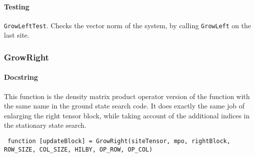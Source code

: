  \paragraph{Testing} \lstinline$GrowLeftTest$. Checks the vector norm of the system, by calling \lstinline$GrowLeft$ on the last site.
 
 \subsubsection{GrowRight}
 \paragraph{Docstring} This function is the density matrix product operator version of the function with the same name in the ground state search code. It does exactly the same job of enlarging the right tensor block, while taking account of the additional indices in the stationary state search.
 \begin{lstlisting}
 function [updateBlock] = GrowRight(siteTensor, mpo, rightBlock, ROW_SIZE, COL_SIZE, HILBY, OP_ROW, OP_COL) \end{lstlisting}
